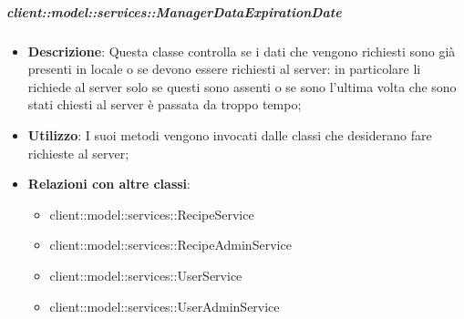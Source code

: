 \begin{itemize}
		\subparagraph{client::model::services::ManagerDataExpirationDate} %
		\label{subp:radarchartcreator}
			\begin{itemize}
				\item \textbf{Descrizione}: Questa classe controlla se i dati che vengono richiesti sono già presenti in locale o se devono essere richiesti al server: in particolare li richiede al server solo se questi sono assenti o se sono l'ultima volta che sono stati chiesti al server è passata da troppo tempo;
				\item \textbf{Utilizzo}: I suoi metodi vengono invocati dalle classi che desiderano fare richieste al server;
				\item \textbf{Relazioni con altre classi}:					
					\begin{itemize}
						\item client::model::services::RecipeService
						\item client::model::services::RecipeAdminService
						\item client::model::services::UserService
						\item client::model::services::UserAdminService
					\end{itemize}
			\end{itemize}


\end{itemize}
